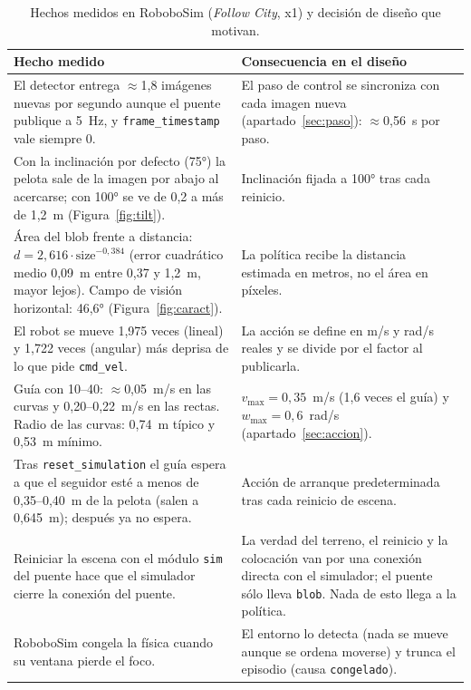 \documentclass[11pt,a4paper]{article}
\newcommand{\cod}[1]{\texttt{\small #1}}
\begin{document}
\begin{table}[h]
\centering\small
\caption{Hechos medidos en RoboboSim (\emph{Follow City}, x1) y decisión de diseño que motivan.}
\label{tab:medidas}
\begin{tabularx}{\linewidth}{@{}YY@{}}
\toprule
Hecho medido & Consecuencia en el diseño \\
\midrule
El detector entrega $\approx$1,8 imágenes nuevas por segundo aunque el puente publique a 5~Hz, y
\cod{frame\_timestamp} vale siempre 0. &
El paso de control se sincroniza con cada imagen nueva (apartado~\ref{sec:paso}): $\approx$0,56~s por paso. \\
Con la inclinación por defecto (75°) la pelota sale de la imagen por abajo al acercarse; con 100° se ve de
0,2 a más de 1,2~m (Figura~\ref{fig:tilt}). & Inclinación fijada a 100° tras cada reinicio. \\
Área del blob frente a distancia: $d = 2{,}616\cdot\text{size}^{-0{,}384}$ (error cuadrático medio 0,09~m entre
0,37 y 1,2~m, mayor lejos). Campo de visión horizontal: 46,6° (Figura~\ref{fig:caract}). &
La política recibe la distancia estimada en metros, no el área en píxeles. \\
El robot se mueve 1,975 veces (lineal) y 1,722 veces (angular) más deprisa de lo que pide \cod{cmd\_vel}. &
La acción se define en m/s y rad/s reales y se divide por el factor al publicarla. \\
Guía con 10--40: $\approx$0,05~m/s en las curvas y 0,20--0,22~m/s en las rectas. Radio de las curvas: 0,74~m
típico y 0,53~m mínimo. & $v_{\max}=0{,}35$~m/s (1,6 veces el guía) y $w_{\max}=0{,}6$~rad/s
(apartado~\ref{sec:accion}). \\
Tras \cod{reset\_simulation} el guía espera a que el seguidor esté a menos de 0,35--0,40~m de la pelota
(salen a 0,645~m); después ya no espera. & Acción de arranque predeterminada tras cada reinicio de escena. \\
Reiniciar la escena con el módulo \cod{sim} del puente hace que el simulador cierre la conexión del puente. &
La verdad del terreno, el reinicio y la colocación van por una conexión directa con el simulador; el puente
sólo lleva \cod{blob}. Nada de esto llega a la política. \\
RoboboSim congela la física cuando su ventana pierde el foco. &
El entorno lo detecta (nada se mueve aunque se ordena moverse) y trunca el episodio (causa \cod{congelado}). \\
\bottomrule
\end{tabularx}
\end{table}
\end{document}

